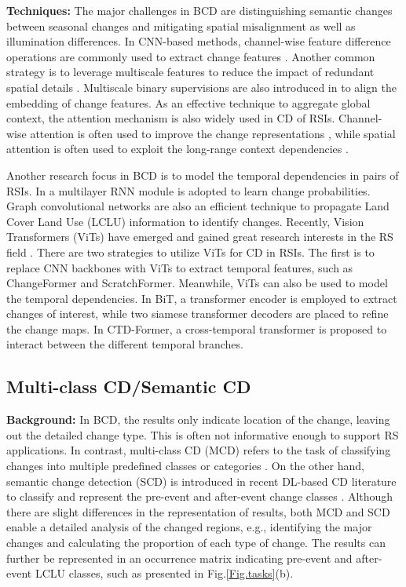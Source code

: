 \textbf{Techniques:} The major challenges in BCD are distinguishing semantic changes between seasonal changes and mitigating spatial misalignment as well as illumination differences. In CNN-based methods, channel-wise feature difference operations are commonly used to extract change features \cite{daudt2018fully, zhang2020feature}. Another common strategy is to leverage multiscale features to reduce the impact of redundant spatial details \cite{hou2021high}. Multiscale binary supervisions are also introduced in \cite{peng2019end} to align the embedding of change features. As an effective technique to aggregate global context, the attention mechanism is also widely used in CD of RSIs. Channel-wise attention is often used to improve the change representations \cite{li2022remote, peng2021scdnet}, while spatial attention is often used to exploit the long-range context dependencies \cite{chen2020dasnet, shi2021deeply}.

Another research focus in BCD is to model the temporal dependencies in pairs of RSIs. In \cite{chen2019change} a multilayer RNN module is adopted to learn change probabilities. Graph convolutional networks are also an efficient technique to propagate Land Cover Land Use (LCLU) information to identify changes\cite{wu2021multiscale}. Recently, Vision Transformers (ViTs) \cite{dosovitskiy2020image,li2024casformer} have emerged and gained great research interests in the RS field \cite{ding2022looking,hong2023cross}. There are two strategies to utilize ViTs for CD in RSIs. The first is to replace CNN backbones with ViTs to extract temporal features, such as ChangeFormer\cite{yuan2022transformer} and ScratchFormer\cite{noman2024remote}. Meanwhile, ViTs can also be used to model the temporal dependencies. In BiT\cite{chen2021remote}, a transformer encoder is employed to extract changes of interest, while two siamese transformer decoders are placed to refine the change maps. In CTD-Former\cite{zhang2023relation}, a cross-temporal transformer is proposed to interact between the different temporal branches.


\subsection{Multi-class CD/Semantic CD}

\textbf{Background:} In BCD, the results only indicate location of the change, leaving out the detailed change type. This is often not informative enough to support RS applications. In contrast, multi-class CD (MCD) refers to the task of classifying changes into multiple predefined classes or categories \cite{bovolo2015time}. On the other hand, semantic change detection (SCD) is introduced in recent DL-based CD literature to classify and represent the pre-event and after-event change classes \cite{daudt2019multitask, yang2021asymmetric}. Although there are slight differences in the representation of results, both MCD and SCD enable a detailed analysis of the changed regions, e.g., identifying the major changes and calculating the proportion of each type of change. The results can further be represented in an occurrence matrix indicating pre-event and after-event LCLU classes, such as presented in Fig.\ref{Fig.tasks}(b).

